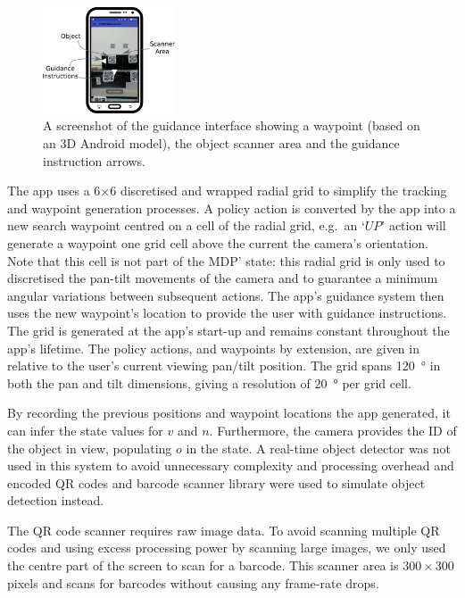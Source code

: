 \documentclass[a4paper, twoside]{article}
\begin{document}
\begin{figure}
  \centering
  \includegraphics[width=0.35\textwidth]{figures/system_screenshot2.png}
  \caption{A screenshot of the guidance interface showing a waypoint (based on an 3D Android model), the object scanner area and the guidance instruction arrows. }\label{fig:system-screenshot}
\end{figure}

The app uses a 6$\times$6 discretised and wrapped radial grid to simplify the tracking and waypoint generation processes. A policy action is converted by the app into a new search waypoint centred on a cell of the radial grid, e.g.\ an `$UP$' action will generate a waypoint one grid cell above the current the camera's orientation. Note that this cell is not part of the MDP' state: this radial grid is only used to discretised the pan-tilt movements of the camera and to guarantee a minimum angular variations between subsequent actions. The app's guidance system then uses the new waypoint's location to provide the user with guidance instructions. The grid is generated at the app's start-up and remains constant throughout the app's lifetime. The policy actions, and waypoints by extension, are given in relative to the user's current viewing pan/tilt position. The grid spans \SI{120}{\degree} in both the pan and tilt dimensions, giving a resolution of \SI{20}{\degree} per grid cell. 

By recording the previous positions and waypoint locations the app generated, it can infer the state values for $v$ and $n$. Furthermore, the camera provides the ID of the object in view, populating $o$ in the state. A real-time object detector was not used in this system to avoid unnecessary complexity and processing overhead and encoded QR codes and barcode scanner library were used to simulate object detection instead. 

The QR code scanner requires raw image data. To avoid scanning multiple QR codes and using excess processing power by scanning large images, we only used the centre part of the screen to scan for a barcode. This scanner area is $300\times300$ pixels and scans for barcodes without causing any frame-rate drops.  
\end{document}
